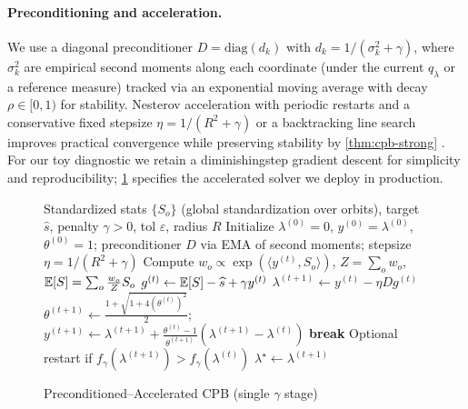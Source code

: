 \paragraph{Preconditioning and acceleration.}
We use a diagonal preconditioner $D=\mathrm{diag}(d_k)$ with $d_k=1/(\sigma_k^2+\gamma)$, where $\sigma_k^2$ are empirical second moments along each coordinate (under the current $q_\lambda$ or a reference measure) tracked via an exponential moving average with decay $\rho\in[0,1)$ for stability. Nesterov acceleration with periodic restarts and a conservative fixed stepsize $\eta=1/(R^2+\gamma)$ or a backtracking line search improves practical convergence while preserving stability by \cref{thm:cpb-strong} \cite{nesterov2004introductory}. For our toy diagnostic we retain a diminishing\textendash step gradient descent for simplicity and reproducibility; \cref{alg:cpb} specifies the accelerated solver we deploy in production.

\begin{figure}[t]
\centering
\begin{adjustbox}{width=\linewidth}
\begin{minipage}{\linewidth}
\begin{algorithm}[H]
\caption{Preconditioned--Accelerated CPB (single $\gamma$ stage)}
\label{alg:cpb}
\begin{algorithmic}[1]
\Require Standardized stats $\{S_o\}$ (global standardization over orbits), target $\widehat s$, penalty $\gamma>0$, tol $\varepsilon$, radius $R$
\State Initialize $\lambda^{(0)}=0$, $y^{(0)}=\lambda^{(0)}$, $\theta^{(0)}=1$; preconditioner $D$ via EMA of second moments; stepsize $\eta=1/(R^2+\gamma)$
  \State Compute $w_o \propto \exp(\langle y^{(t)},S_o\rangle)$, $Z=\sum_o w_o$, $\mathbb{E}[S]=\sum_o \frac{w_o}{Z} S_o$
  \State $g^{(t)} \gets \mathbb{E}[S]-\widehat s + \gamma y^{(t)}$
  \State $\lambda^{(t+1)} \gets y^{(t)} - \eta D g^{(t)}$
  \State $\theta^{(t+1)} \gets \tfrac{1+\sqrt{1+4(\theta^{(t)})^2}}{2}$; $y^{(t+1)} \gets \lambda^{(t+1)} + \tfrac{\theta^{(t)}-1}{\theta^{(t+1)}}(\lambda^{(t+1)}-\lambda^{(t)})$
   \textbf{break} \EndIf
  \State Optional restart if $f_\gamma(\lambda^{(t+1)})>f_\gamma(\lambda^{(t)})$
\EndFor
\State \Return $\lambda^{\star}\gets \lambda^{(t+1)}$
\end{algorithmic}
\end{algorithm}
\end{minipage}
\end{adjustbox}
\end{figure}

